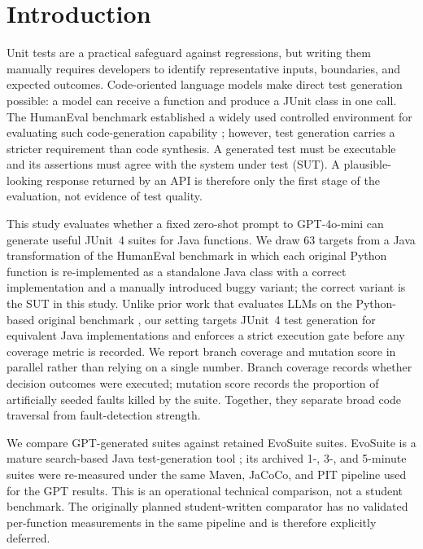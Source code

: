 \section{Introduction}
\label{sec:intro}

Unit tests are a practical safeguard against regressions, but writing them manually requires developers to identify representative inputs, boundaries, and expected outcomes. Code-oriented language models make direct test generation possible: a model can receive a function and produce a JUnit class in one call. The HumanEval benchmark established a widely used controlled environment for evaluating such code-generation capability \cite{yuan2024junit}; however, test generation carries a stricter requirement than code synthesis. A generated test must be executable and its assertions must agree with the system under test (SUT). A plausible-looking response returned by an API is therefore only the first stage of the evaluation, not evidence of test quality.

This study evaluates whether a fixed zero-shot prompt to GPT-4o-mini can generate useful JUnit~4 suites for Java functions. We draw 63 targets from a Java transformation of the HumanEval benchmark in which each original Python function is re-implemented as a standalone Java class with a correct implementation and a manually introduced buggy variant; the correct variant is the SUT in this study. Unlike prior work that evaluates LLMs on the Python-based original benchmark \cite{yuan2024junit}, our setting targets JUnit~4 test generation for equivalent Java implementations and enforces a strict execution gate before any coverage metric is recorded. We report branch coverage and mutation score in parallel rather than relying on a single number. Branch coverage records whether decision outcomes were executed; mutation score records the proportion of artificially seeded faults killed by the suite. Together, they separate broad code traversal from fault-detection strength.

We compare GPT-generated suites against retained EvoSuite suites. EvoSuite is a mature search-based Java test-generation tool \cite{Tang_2024}; its archived 1-, 3-, and 5-minute suites were re-measured under the same Maven, JaCoCo, and PIT pipeline used for the GPT results. This is an operational technical comparison, not a student benchmark. The originally planned student-written comparator has no validated per-function measurements in the same pipeline and is therefore explicitly deferred.

